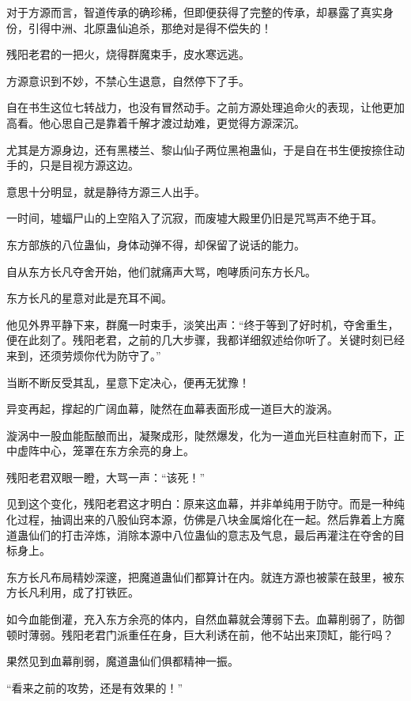 
\begin{this_body}

对于方源而言，智道传承的确珍稀，但即便获得了完整的传承，却暴露了真实身份，引得中洲、北原蛊仙追杀，那绝对是得不偿失的！

残阳老君的一把火，烧得群魔束手，皮水寒远逃。

方源意识到不妙，不禁心生退意，自然停下了手。

自在书生这位七转战力，也没有冒然动手。之前方源处理追命火的表现，让他更加高看。他心思自己是靠着千解才渡过劫难，更觉得方源深沉。

尤其是方源身边，还有黑楼兰、黎山仙子两位黑袍蛊仙，于是自在书生便按捺住动手的，只是目视方源这边。

意思十分明显，就是静待方源三人出手。

一时间，墟蝠尸山的上空陷入了沉寂，而废墟大殿里仍旧是咒骂声不绝于耳。

东方部族的八位蛊仙，身体动弹不得，却保留了说话的能力。

自从东方长凡夺舍开始，他们就痛声大骂，咆哮质问东方长凡。

东方长凡的星意对此是充耳不闻。

他见外界平静下来，群魔一时束手，淡笑出声：“终于等到了好时机，夺舍重生，便在此刻了。残阳老君，之前的几大步骤，我都详细叙述给你听了。关键时刻已经来到，还须劳烦你代为防守了。”

当断不断反受其乱，星意下定决心，便再无犹豫！

异变再起，撑起的广阔血幕，陡然在血幕表面形成一道巨大的漩涡。

漩涡中一股血能酝酿而出，凝聚成形，陡然爆发，化为一道血光巨柱直射而下，正中虚阵中心，笼罩在东方余亮的身上。

残阳老君双眼一瞪，大骂一声：“该死！”

见到这个变化，残阳老君这才明白：原来这血幕，并非单纯用于防守。而是一种纯化过程，抽调出来的八股仙窍本源，仿佛是八块金属熔化在一起。然后靠着上方魔道蛊仙们的打击淬炼，消除本源中八位蛊仙的意志及气息，最后再灌注在夺舍的目标身上。

东方长凡布局精妙深邃，把魔道蛊仙们都算计在内。就连方源也被蒙在鼓里，被东方长凡利用，成了打铁匠。

如今血能倒灌，充入东方余亮的体内，自然血幕就会薄弱下去。血幕削弱了，防御顿时薄弱。残阳老君门派重任在身，巨大利诱在前，他不站出来顶缸，能行吗？

果然见到血幕削弱，魔道蛊仙们俱都精神一振。

“看来之前的攻势，还是有效果的！”


\end{this_body}

